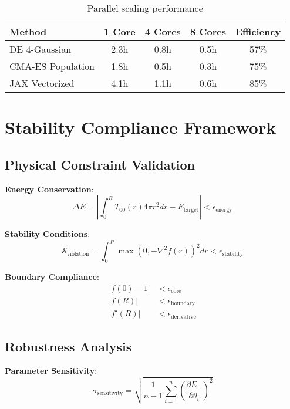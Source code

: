 \documentclass[11pt,a4paper]{article}
\begin{document}
\begin{table}[h]
\centering
\begin{tabular}{lcccc}
\hline
Method & 1 Core & 4 Cores & 8 Cores & Efficiency \\
\hline
DE 4-Gaussian & 2.3h & 0.8h & 0.5h & 57\% \\
CMA-ES Population & 1.8h & 0.5h & 0.3h & 75\% \\
JAX Vectorized & 4.1h & 1.1h & 0.6h & 85\% \\
\hline
\end{tabular}
\caption{Parallel scaling performance}
\end{table}

\section{Stability Compliance Framework}

\subsection{Physical Constraint Validation}

\textbf{Energy Conservation}:
\begin{equation}
\Delta E = \left|\int_0^R T_{00}(r) 4\pi r^2 dr - E_{\text{target}}\right| < \epsilon_{\text{energy}}
\end{equation}

\textbf{Stability Conditions}:
\begin{equation}
\mathcal{S}_{\text{violation}} = \int_0^R \max(0, -\nabla^2 f(r))^2 dr < \epsilon_{\text{stability}}
\end{equation}

\textbf{Boundary Compliance}:
\begin{align}
|f(0) - 1| &< \epsilon_{\text{core}} \\
|f(R)| &< \epsilon_{\text{boundary}} \\
|f'(R)| &< \epsilon_{\text{derivative}}
\end{align}

\subsection{Robustness Analysis}

\textbf{Parameter Sensitivity}:
\begin{equation}
\sigma_{\text{sensitivity}} = \sqrt{\frac{1}{n-1} \sum_{i=1}^n \left(\frac{\partial E_-}{\partial \theta_i}\right)^2}
\end{equation}
\end{document}
